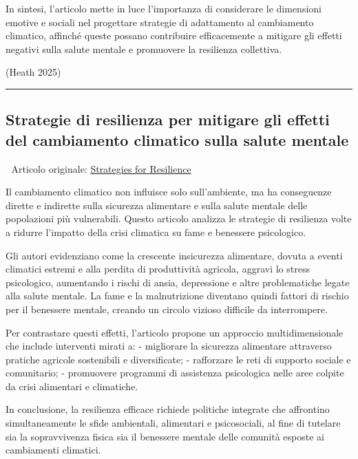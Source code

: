 \documentclass[
  italian,
]{article}
\begin{document}
In sintesi, l'articolo mette in luce l'importanza di considerare le
dimensioni emotive e sociali nel progettare strategie di adattamento al
cambiamento climatico, affinché queste possano contribuire efficacemente
a mitigare gli effetti negativi sulla salute mentale e promuovere la
resilienza collettiva.

(Heath 2025)

\begin{center}\rule{0.5\linewidth}{0.5pt}\end{center}

\subsection{Strategie di resilienza per mitigare gli effetti del
cambiamento climatico sulla salute
mentale}\label{strategie-di-resilienza-per-mitigare-gli-effetti-del-cambiamento-climatico-sulla-salute-mentale}

📄 Articolo originale:
\href{https://www.sciencedirect.com/science/article/pii/S2666154325003941}{Strategies
for Resilience}

Il cambiamento climatico non influisce solo sull'ambiente, ma ha
conseguenze dirette e indirette sulla sicurezza alimentare e sulla
salute mentale delle popolazioni più vulnerabili. Questo articolo
analizza le strategie di resilienza volte a ridurre l'impatto della
crisi climatica su fame e benessere psicologico.

Gli autori evidenziano come la crescente insicurezza alimentare, dovuta
a eventi climatici estremi e alla perdita di produttività agricola,
aggravi lo stress psicologico, aumentando i rischi di ansia, depressione
e altre problematiche legate alla salute mentale. La fame e la
malnutrizione diventano quindi fattori di rischio per il benessere
mentale, creando un circolo vizioso difficile da interrompere.

Per contrastare questi effetti, l'articolo propone un approccio
multidimensionale che include interventi mirati a: - migliorare la
sicurezza alimentare attraverso pratiche agricole sostenibili e
diversificate; - rafforzare le reti di supporto sociale e comunitario; -
promuovere programmi di assistenza psicologica nelle aree colpite da
crisi alimentari e climatiche.

In conclusione, la resilienza efficace richiede politiche integrate che
affrontino simultaneamente le sfide ambientali, alimentari e
psicosociali, al fine di tutelare sia la sopravvivenza fisica sia il
benessere mentale delle comunità esposte ai cambiamenti climatici.
\end{document}
